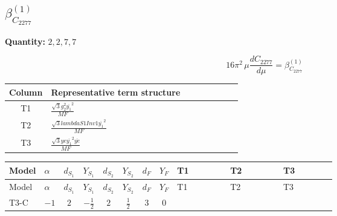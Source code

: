 \documentclass[8pt]{article}
\begin{document}
\begin{landscape}
\section*{$\beta_{C_{2277}}^{(1)}$}
\noindent\textbf{Quantity: }$\mathrm{2,2,7,7}$\par\smallskip
\[16\pi^2\,\mu\frac{d C_{2277}}{d\mu}=\beta_{C_{2277}}^{(1)}\]
\begin{center}
\begin{tabular}{@{}c >{\raggedright\arraybackslash}p{0.82\linewidth}@{}}
\toprule
Column & Representative term structure \\
\midrule
T1 & \(\displaystyle \frac{\sqrt{3} g_{2}^{2} \overline{y_{1}}^{2}}{MF}\) \\
\midrule
T2 & \(\displaystyle \frac{\sqrt{3} lambdaS1Inv1 \overline{y_{1}}^{2}}{MF}\) \\
\midrule
T3 & \(\displaystyle \frac{\sqrt{3} ye \overline{y_{1}}^{2} \overline{ye}}{MF}\) \\
\midrule
\bottomrule
\end{tabular}
\end{center}
\smallskip
\tiny
\begin{longtable}{@{}llcccccc >{\raggedright\arraybackslash}p{0.21\linewidth} >{\raggedright\arraybackslash}p{0.21\linewidth} >{\raggedright\arraybackslash}p{0.21\linewidth}@{}}
\toprule
Model & $\alpha$ & $d_{S_1}$ & $Y_{S_1}$ & $d_{S_2}$ & $Y_{S_2}$ & $d_F$ & $Y_F$ & T1 & T2 & T3 \\
\midrule
\endfirsthead
\toprule
Model & $\alpha$ & $d_{S_1}$ & $Y_{S_1}$ & $d_{S_2}$ & $Y_{S_2}$ & $d_F$ & $Y_F$ & T1 & T2 & T3 \\
\midrule
\endhead
T3-C & $-1$ & $2$ & $-\frac{1}{2}$ & $2$ & $\frac{1}{2}$ & $3$ & $0$ & \scriptsize\adjustbox{max width=\linewidth}{$\begin{gathered} - \frac{\sqrt{3} g_{2}^{2} \overline{y_{1}}^{2}}{4 MF}\end{gathered}$} & \scriptsize\adjustbox{max width=\linewidth}{$\begin{gathered} - \frac{\sqrt{3} lambdaS1Inv1 \overline{y_{1}}^{2}}{6 MF}\end{gathered}$} & \scriptsize\adjustbox{max width=\linewidth}{$\begin{gathered} \frac{\sqrt{3} ye \overline{y_{1}}^{2} \overline{ye}}{12 MF}\end{gathered}$} \\
\midrule
\bottomrule
\end{longtable}
\clearpage

\end{landscape}
\end{document}
